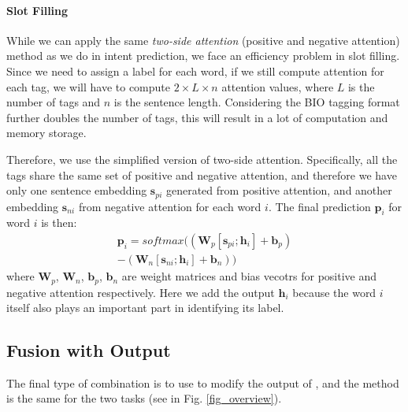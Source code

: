 \paragraph{Slot Filling}
While we can apply the same \emph{two-side attention} (positive and negative attention) method as we do in intent prediction, we face an efficiency problem in slot filling. Since we need to assign a label for each word, if we still compute attention for each tag, we will have to compute $2\times L \times n$ attention values, where $L$ is the number of tags and $n$ is the sentence length. Considering the BIO tagging format further doubles the number of tags, this will result in a lot of computation and memory storage. 

Therefore, we use the simplified version of two-side attention. Specifically, all the tags share the same set of positive and negative attention, and therefore we have only one sentence embedding $\textbf{s}_{pi}$ generated from positive attention, and another embedding $\textbf{s}_{ni}$ from negative attention for each word $i$. The final prediction $\textbf{p}_i$ for word $i$ is then:
\begin{equation}
\begin{split}
\textbf{p}_i = softmax((\textbf{W}_p [\textbf{s}_{pi}; \textbf{h}_i] + \textbf{b}_p) \\- (\textbf{W}_n [\textbf{s}_{ni}; \textbf{h}_i] + \textbf{b}_n))
\end{split} 
\end{equation} 
where $\textbf{W}_{p}$, $\textbf{W}_{n}$, $\textbf{b}_{p}$, $\textbf{b}_{n}$ are weight matrices and bias vecotrs for positive and negative attention respectively. Here we add the \BLSTM output $\textbf{h}_i$ because the word $i$ itself also plays an important part in identifying its label.

\subsection{Fusion with Output}
\label{fusion_with_output}
The final type of combination is to use \RE to modify the output of \NN, and the method is the same for the two tasks (see  in Fig. \ref{fig_overview}). 


